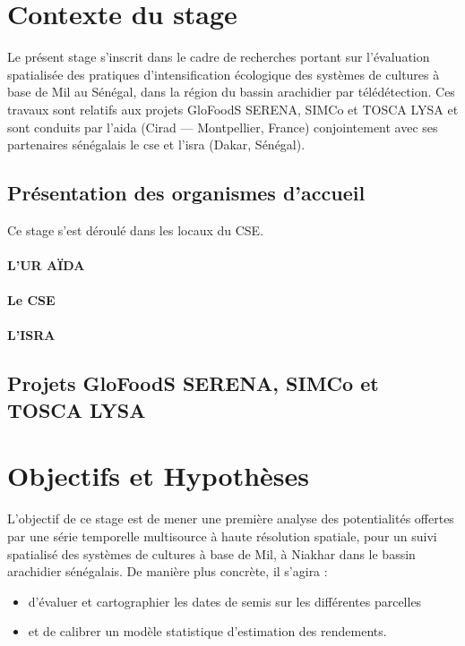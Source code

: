 \section{Contexte du stage}

Le présent stage s'inscrit dans le cadre de recherches portant sur l’évaluation spatialisée des pratiques d’intensification écologique des systèmes de cultures à base de Mil au 
Sénégal, dans la région du bassin arachidier par télédétection. Ces travaux sont relatifs aux projets GloFoodS SERENA, SIMCo et TOSCA LYSA et sont conduits par 
l'\acrshort{aida} (Cirad --- Montpellier, France) conjointement avec ses partenaires sénégalais le \acrshort{cse} et l'\acrshort{isra} (Dakar, Sénégal).

  \subsection{Présentation des organismes d'accueil}
Ce stage s'est déroulé dans les locaux du CSE.
    
    \paragraph{L'UR AÏDA}
    
    \paragraph{Le CSE}
    
    \paragraph{L'ISRA}
    
  
  \subsection{Projets GloFoodS SERENA, SIMCo et TOSCA LYSA}

\section{Objectifs et Hypothèses}

L'objectif de ce stage est de mener une première analyse des potentialités offertes par une série temporelle multisource à haute résolution spatiale, pour un suivi spatialisé des 
systèmes de cultures à base de Mil, à Niakhar dans le bassin arachidier sénégalais. De manière plus concrète, il s'agira :
  \begin{itemize}
   \item d'évaluer et cartographier les dates de semis sur les différentes parcelles
   \item et de calibrer un modèle statistique d'estimation des rendements.
  \end{itemize}
 
